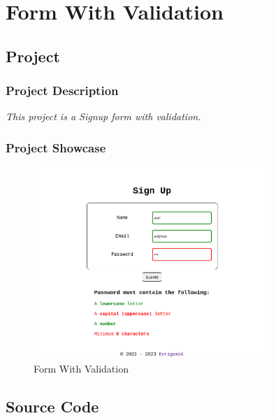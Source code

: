 \section{Form With Validation}\label{sec:form}

\subsection{Project}

\subsubsection*{Project Description}

\textit{This project is a Signup form with validation.}

\subsubsection*{Project Showcase}
\begin{figure}[H]
    \centering
    \includegraphics[width=0.8\textwidth]{res/form.png}
    \caption{Form With Validation}
    \label{fig:form}
\end{figure}

\subsection{Source Code}

\inputminted[linenos, breaklines, encoding=utf8, frame=lines]{html}{"./code/form.html"}


\pagebreak
